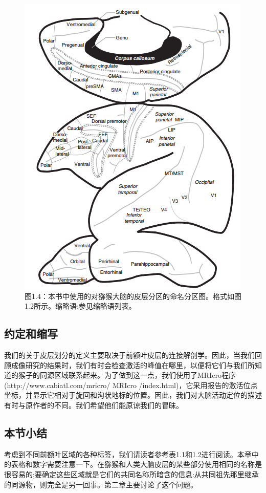 \begin{figure}[!htb]
	\centering
	\includegraphics[width=0.5\linewidth]{image_pfc/Fig_1_4}
	\caption*{图1.4：本书中使用的对猕猴大脑的皮层分区的命名分区图。格式如图1.2所示。缩略语:参见缩略语列表。}
\end{figure}




\subsection{约定和缩写}
我们的关于皮层划分的定义主要取决于前额叶皮层的连接解剖学。因此，当我们回顾成像研究的结果时，我们有时会检查激活的峰值在哪里，以便将它们与我们所知道的猴子的同源区域联系起来。为了做到这一点，我们使用了MRIcro程序(http://www.cabiatl.com/mricro/ MRIcro /index.html)，它采用报告的激活位点坐标，并显示它相对于旋回和沟状地标的位置。因此，我们对大脑活动定位的描述有时与原作者的不同。我们希望他们能原谅我们的冒昧。

\subsection{本节小结}
考虑到不同前额叶区域的各种标签，我们请读者参考表1.1和1.2进行阅读。本章中的表格和数字需要注意一下。在猕猴和人类大脑皮层的某些部分使用相同的名称是很容易的;要确定这些区域就是它们的共同名称所暗含的信息:从共同祖先那里继承的同源物，则完全是另一回事。第二章主要讨论了这个问题。

